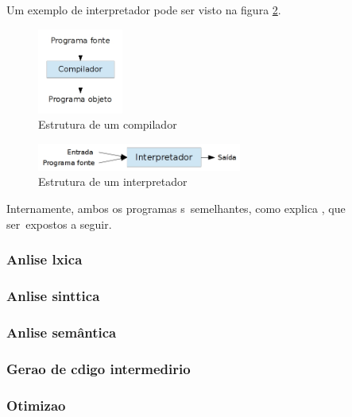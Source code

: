 Um exemplo de interpretador pode ser visto na figura \ref{fig:interpretador}.

\begin{figure}[htp]
  \begin{center}
    \includegraphics[width=0.25\textwidth]{figuras/compilador}
  \end{center}
  \caption{Estrutura de um compilador}
  \label{fig:compilador}
\end{figure}

\begin{figure}[htp]
  \begin{center}
    \includegraphics[width=0.6\textwidth]{figuras/interpretador}
  \end{center}
  \caption{Estrutura de um interpretador}
  \label{fig:interpretador}
\end{figure}

Internamente, ambos os programas s\ao\ semelhantes, como explica \cite{Aho08}, que ser\ao\ expostos a seguir.

\subsubsection{An\ah lise l\eh xica}
\subsubsection{An\ah lise sint\ah tica}
\subsubsection{An\ah lise sem\^antica}
\subsubsection{Gera\ca o de c\oh digo intermedi\ah rio}
\subsubsection{Otimiza\ca o}
